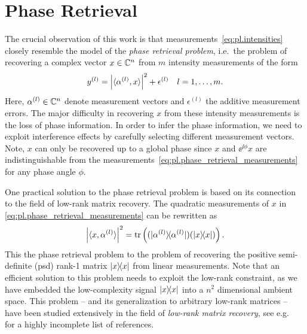 \section{Phase Retrieval}%
\label{sec:pl.phase_retrieval}

The crucial observation of this work is that measurements~\eqref{eq:pl.intensities} closely resemble the model of the \textit{phase retrieval problem}, i.e.\ the problem of recovering a complex vector ${x} \in {\mathbb{C}}^n$ from $m$ intensity measurements of the form
\[
  y^{(l)}= {\left\vert\braket{\alpha^{(l)}, x}\right\vert}^2 + \epsilon^{(l)}
  \quad l=1,\ldots,m.
  \label{eq:pl.phase_retrieval_measurements}
\]
Here, $\alpha^{(l)} \in {\mathbb{C}}^n$ denote measurement vectors and $\epsilon^{(l)}$ the additive measurement errors.
The major difficulty in recovering $x$ from these intensity measurements is the loss of phase information.
In order to infer the phase information, we need to exploit interference effects by carefully selecting different measurement vectors.
Note, $x$ can only be recovered up to a global phase since $x$ and $\ee^{\ii\phi} x$ are indistinguishable from the measurements~\eqref{eq:pl.phase_retrieval_measurements} for any phase angle $\phi$.

One practical solution to the phase retrieval problem is based on its connection to the field of low-rank matrix recovery.
The quadratic measurements of $x$ in \cref{eq:pl.phase_retrieval_measurements} can be rewritten as
\[
  \left| \langle {x}, \alpha^{(l)} \rangle \right|^2
  = \tr \left( (\ket{\alpha^{(l)}}\bra{\alpha^{(l)}}) (\ket{{x}}\bra{{x}}) \right).
\]
This  the phase retrieval problem to the problem of recovering the positive semi-definite (psd) rank-1 matrix $\ketbra{x}$ from linear measurements.
Note that an efficient solution to this problem needs to exploit the low-rank constraint, as we have embedded the low-complexity signal $\ketbra{x}$ into a $n^2$ dimensional ambient space.
This problem -- and its generalization to arbitrary low-rank matrices -- have been studied extensively in the field of \emph{low-rank matrix recovery}, see e.g.~\cite{Ahmed_2014_Blind,Candes_2009_Exact,Candes_2011_Tight,Recht_2010_Guaranteed,Gross_2011_Recovering,Chen_2015_IncoherenceOptimal} for a highly incomplete list of references.

